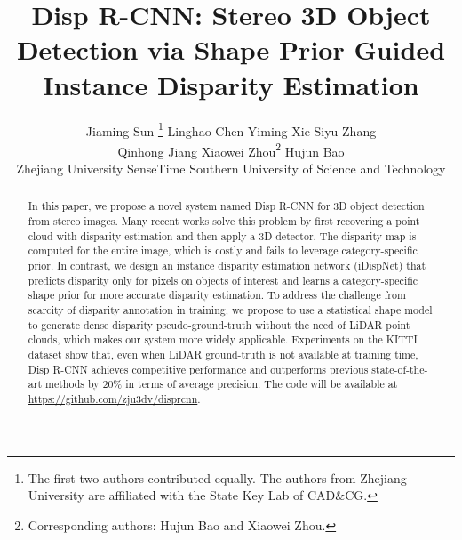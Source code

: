 \documentclass[10pt,twocolumn,letterpaper]{article}
\begin{document}
\title{Disp R-CNN: Stereo 3D Object Detection via Shape Prior Guided \\ Instance Disparity Estimation}

\author{
    Jiaming Sun 
    \thanks{The first two authors contributed equally. The authors from Zhejiang University are affiliated with the State Key Lab of CAD\&CG.}
    \quad Linghao Chen 
    \quad Yiming Xie 
    \quad Siyu Zhang \\
    \quad Qinhong Jiang 
    \quad Xiaowei Zhou\thanks{Corresponding authors: Hujun Bao and Xiaowei Zhou.}
    \quad Hujun Bao \\
    Zhejiang University \quad 
    SenseTime \quad
    Southern University of Science and Technology \\
}
\maketitle
\begin{abstract}
  
In this paper, we propose a novel system named Disp R-CNN for 3D object detection from stereo images.
Many recent works solve this problem by first recovering a point cloud with disparity estimation and then apply a 3D detector. The disparity map is computed for the entire image, which is costly and fails to leverage category-specific prior. 
In contrast, we design an instance disparity estimation network (iDispNet) that predicts disparity only for pixels on objects of interest and learns a category-specific shape prior for more accurate disparity estimation.
To address the challenge from scarcity of disparity annotation in training, we propose to use a statistical shape model to generate dense disparity pseudo-ground-truth without the need of LiDAR point clouds, which makes our system more widely applicable.
Experiments on the KITTI dataset show that, even when LiDAR ground-truth is not available at training time, Disp R-CNN achieves competitive performance and outperforms previous state-of-the-art methods by 20\% in terms of average precision.
The code will be available at \url{https://github.com/zju3dv/disprcnn}.


 \end{abstract}
\end{document}
